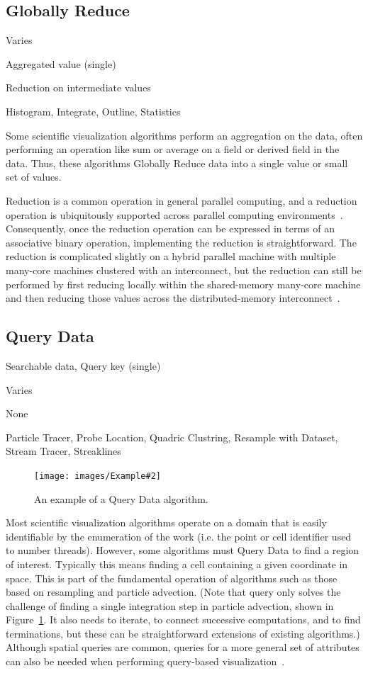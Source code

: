 \documentclass{sig-alternate}
\newcommand*{\lcite}[1]{~\cite{#1}}
\newcommand{\algclass}[1]{\textsf{#1}}
\newcommand{\algorithmclasssection}[1]{\subsection*{#1}}
\newcommand{\algorithmclass}[5]{
  \algorithmclasssection{#1} %
  \begin{description}[leftmargin=9em,style=nextline,noitemsep]
    \raggedright
  \item[Input] #2
  \item[Output] #3
  \item[Interdependence] #4
  \item[Algorithms] #5
  \end{description}
}
\newcommand{\exampleimage}[2][.24]{\texttt{[image: images/Example\#2]}}
\begin{document}
\algorithmclass{Globally Reduce}
               {Varies} %
               {Aggregated value (single)} %
               {Reduction on intermediate values} %
               {
                 Histogram,
                 Integrate,
                 Outline,
                 Statistics
               }

\noindent
Some scientific visualization algorithms perform an aggregation on the
data, often performing an operation like sum or average on a field or
derived field in the data. Thus, these algorithms \algclass{Globally
  Reduce} data into a single value or small set of values.

Reduction is a common operation in general parallel computing, and a
reduction operation is ubiquitously supported across parallel computing
environments\lcite{MPI,Sanders2011,Thrust,TBB,Quinn2004}. Consequently,
once the reduction operation can be expressed in terms of an associative
binary operation, implementing the reduction is straightforward. The
reduction is complicated slightly on a hybrid parallel machine with
multiple many-core machines clustered with an interconnect, but the
reduction can still be performed by first reducing locally within the
shared-memory many-core machine and then reducing those values across the
distributed-memory interconnect\lcite{Dinan2010}.


\algorithmclass{Query Data}
               {Searchable data, Query key (single)} %
               {Varies} %
               {None} %
               {
                 Particle Tracer,
                 Probe Location,
                 Quadric Clustring,
                 Resample with Dataset,
                 Stream Tracer,
                 Streaklines
               }

\begin{figure}[b]
  \centering
  \exampleimage[.4]{StreamTracer}
  \caption{An example of a \algclass{Query Data} algorithm.}
  \label{fig:QueryData}
\end{figure}

\noindent
Most scientific visualization algorithms operate on a domain that is easily
identifiable by the enumeration of the work (i.e. the point or cell
identifier used to number threads). However, some algorithms must
\algclass{Query Data} to find a region of interest. Typically this means
finding a cell containing a given coordinate in space. This is part of the
fundamental operation of algorithms such as those based on resampling and
particle advection. (Note that query only solves the challenge of finding a
single integration step in particle advection, shown in
Figure~\ref{fig:QueryData}. It also needs to iterate, to connect successive
computations, and to find terminations, but these can be straightforward
extensions of existing algorithms.) Although spatial queries are common,
queries for a more general set of attributes can also be needed when
performing query-based
visualization\lcite{Glatter2008,Gosink2008,Johnson2009,Rubel2008}.
\end{document}
